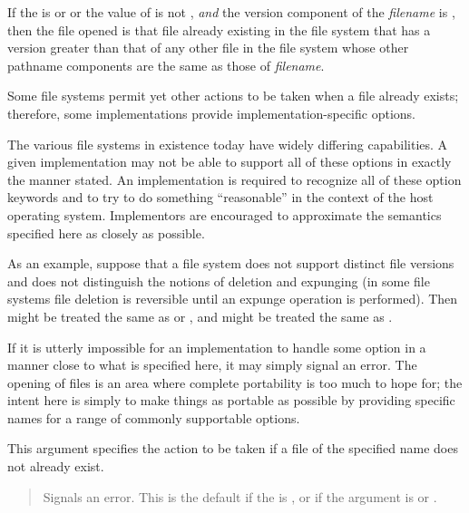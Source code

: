 \begin{defun}[Function]
\begin{flushdesc}
If the  is  or 
or the value of  is not ,
\emph{and} the version component of the \emph{filename} is ,
then the file opened is that file already existing in the file system
that has a version greater than that of any other file in the file system
whose other pathname components are the same as those of \emph{filename}.

\begin{new}
Some file systems permit yet other actions to be taken when a file
already exists; therefore,
some implementations provide implementation-specific  options.
\end{new}
\end{flushdesc}

\beforenoterule
\begin{implementation}
The various file systems in existence today
have widely differing capabilities.  A given implementation may not
be able to support all of these options in exactly the manner stated.
An implementation is required to recognize all of these option keywords
and to try to do something ``reasonable'' in the context of the host operating
system.  Implementors are encouraged to approximate the semantics specified
here as closely as possible.

As an example, suppose that a file system does not support distinct file
versions and does not distinguish the notions of deletion and expunging
(in some file systems file deletion is reversible until an expunge operation
is performed).  Then  might be treated the same as
 or , and  might
be treated the same as .

If it is utterly impossible for an implementation to handle some option
in a manner close to what is specified here, it may simply signal an error.
The opening of files is an area where complete portability is too much to
hope for; the intent here is simply to make things as portable as possible
by providing specific names for a range of commonly supportable options.
\end{implementation}
\afternoterule

\begin{flushdesc}
\item[\cd{:if-does-not-exist}]
This argument specifies the action to be taken if
a file of the specified name does not already exist.\vadjust{\vskip2pt}
\begin{quotation}
\begin{flushdesc}
\item[\cd{:error}]
Signals an error.  This is the default if the  is ,
or if the  argument is  or .


\end{flushdesc}
\end{quotation}
\end{flushdesc}
\end{defun}
